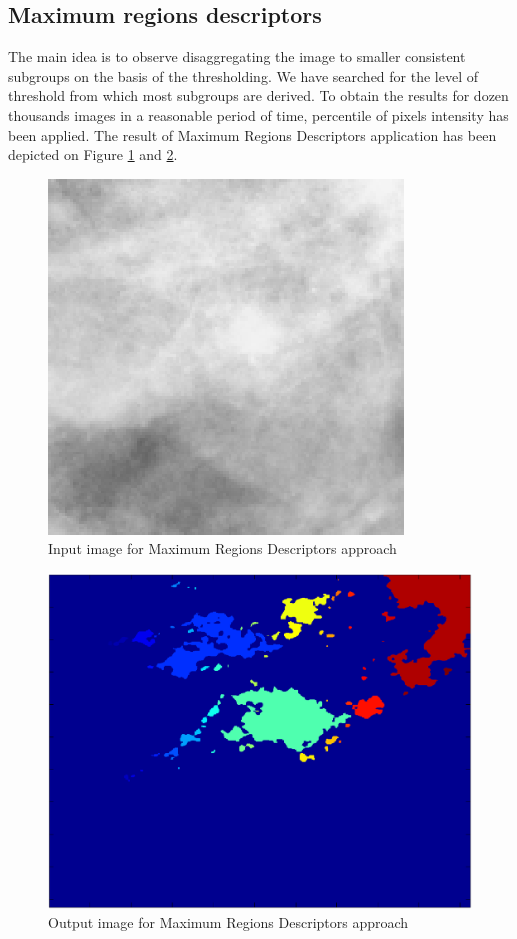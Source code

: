 \documentclass[review,12pt]{elsarticle}
\begin{document}
\subsection{Maximum regions descriptors}

The main idea is to observe disaggregating the image to smaller consistent subgroups on the basis of the thresholding. We have searched for the level of threshold  from which most subgroups are derived. To obtain the results for dozen thousands images in a reasonable period of time, percentile of pixels intensity has been applied. The result of Maximum Regions Descriptors application has been depicted on Figure \ref{fig:InputMaximumRegionsDescriptors} and \ref{fig:OutputMaximumRegionsDescriptors}.

\begin{figure}
\center
\includegraphics[scale=1.6]{images/InputMaximumRegionsDescriptorsNEW.eps}
\caption{Input image for Maximum Regions Descriptors approach}
\label{fig:InputMaximumRegionsDescriptors}
\end{figure}

\begin{figure}
\center
\includegraphics[scale=0.45]{images/OutputMaximumRegionsDescriptorsNEW.eps}
\caption{Output image for Maximum Regions Descriptors approach}
\label{fig:OutputMaximumRegionsDescriptors}
\end{figure}
\end{document}
